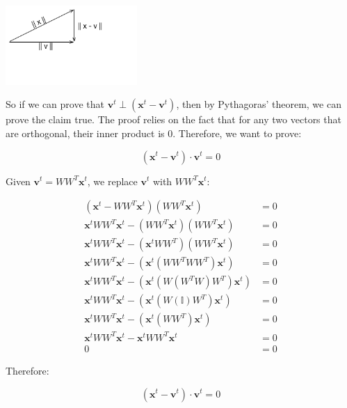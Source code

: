 \documentclass{article}
\begin{document}
\begin{center}
  \includegraphics[width=50mm, scale=0.5]{x-minus-v.png}
\end{center}

So if we can prove that $ \mathbf{v}^t \perp (\mathbf{x}^t - \mathbf{v}^t)$, then by Pythagoras' theorem, we can prove the claim true.  The proof relies on the fact that for any two vectors that are orthogonal, their inner product is 0.  Therefore, we want to prove:

\begin{equation}
(\mathbf{x}^t - \mathbf{v}^t) \cdot \mathbf{v}^t = 0
\end{equation}

Given $\mathbf{v}^t = WW^T\mathbf{x}^t$, we replace $\mathbf{v}^t$ with $WW^T\mathbf{x}^t$:

\begin{equation}
\begin{aligned}
(\mathbf{x}^t - WW^T\mathbf{x}^t)(WW^T\mathbf{x}^t) &= 0 \\
\mathbf{x}^t WW^T \mathbf{x}^t - (WW^T\mathbf{x}^t)(WW^T\mathbf{x}^t) &= 0 \\
\mathbf{x}^t WW^T \mathbf{x}^t - (\mathbf{x}^tWW^T)(WW^T\mathbf{x}^t) &= 0 \\
\mathbf{x}^t WW^T \mathbf{x}^t - (\mathbf{x}^t(WW^TWW^T)\mathbf{x}^t) &= 0 \\
\mathbf{x}^t WW^T \mathbf{x}^t - (\mathbf{x}^t(W(W^TW)W^T)\mathbf{x}^t) &= 0 \\
\mathbf{x}^t WW^T \mathbf{x}^t - (\mathbf{x}^t(W(\mathbb{I})W^T)\mathbf{x}^t) &= 0 \\
\mathbf{x}^t WW^T \mathbf{x}^t - (\mathbf{x}^t(WW^T)\mathbf{x}^t) &= 0 \\
\mathbf{x}^t WW^T \mathbf{x}^t - \mathbf{x}^tWW^T\mathbf{x}^t &= 0 \\
0 &= 0
\end{aligned}
\end{equation}

Therefore:

\begin{equation}
(\mathbf{x}^t - \mathbf{v}^t) \cdot \mathbf{v}^t = 0
\end{equation}
\end{document}
